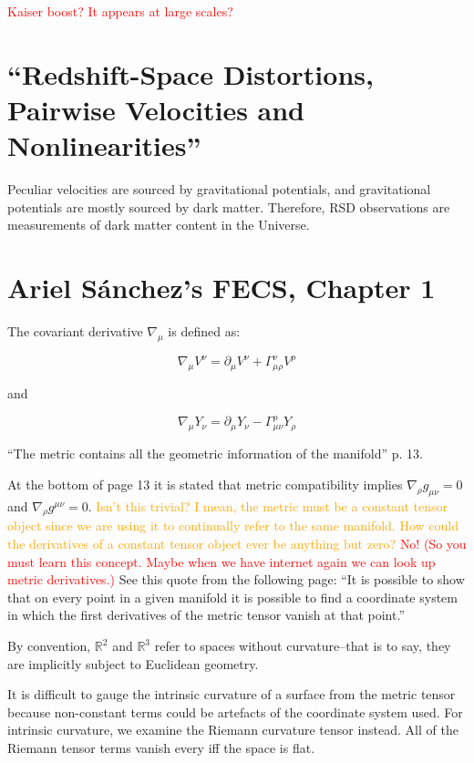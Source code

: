 \documentclass[11pt]{article}
\begin{document}
\textcolor{red}{Kaiser boost? It appears at large scales?}

\section{``Redshift-Space Distortions, Pairwise Velocities and
Nonlinearities''}

Peculiar velocities are sourced by gravitational potentials, and gravitational
potentials are mostly sourced by dark matter. Therefore, RSD observations are
measurements of dark matter content in the Universe.

\section{Ariel S\'{a}nchez's FECS, Chapter 1}

The covariant derivative $\nabla_\mu$ is defined as:

\begin{equation}
	\nabla_\mu V^\nu = \partial_\mu V^\nu + \Gamma^\nu_{\mu \rho} V^\rho
\end{equation}

and

\begin{equation}
	\nabla_\mu Y_\nu = \partial_\mu Y_\nu - \Gamma^\rho_{\mu \nu} Y_\rho
\end{equation}

``The metric contains all the geometric information of the manifold'' p. 13.

At the bottom of page 13 it is stated that metric compatibility implies
$\nabla_\rho g_{\mu \nu} = 0$ and $\nabla_\rho  g^{\mu \nu} = 0$.
\textcolor{orange}{Isn't this trivial? I mean, the metric must be a constant
tensor object since we are using it to continually refer to the same manifold.
How could the derivatives of a constant tensor object ever be anything but
zero?} \textcolor{red}{No! (So you must learn this concept. Maybe when we have
internet again we can look up metric derivatives.)} See this quote from the
following page: ``It is possible to show that on every point in a given
manifold it is possible to find a coordinate system in which the first
derivatives of the metric tensor vanish at that point.''

By convention, $\mathbb{R}^2$ and $\mathbb{R}^3$ refer to spaces without
curvature--that is to say, they are implicitly subject to Euclidean geometry.

It is difficult to gauge the intrinsic curvature of a surface from the metric
tensor because non-constant terms could be artefacts of the coordinate system
used. For intrinsic curvature, we examine the Riemann curvature tensor instead.
All of the Riemann tensor terms vanish every iff the space is flat.
\end{document}
